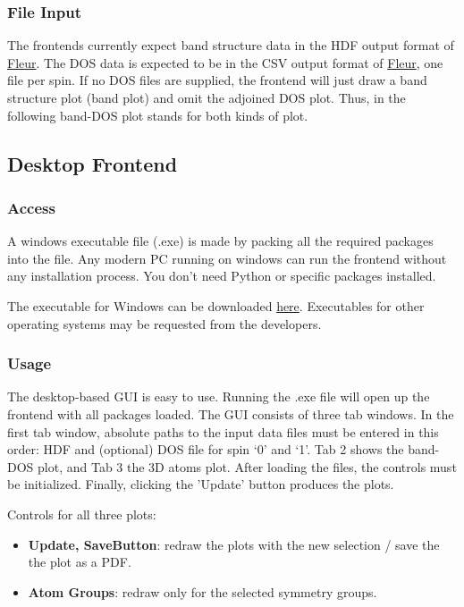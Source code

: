 \subsubsection{File Input}\label{file-input}

The frontends currently expect band structure data in the HDF output format of
\href{http://www.judft.de}{Fleur}. The DOS data is expected
to be in the CSV output format of \href{http://www.judft.de}{Fleur}, one file
per spin. If no DOS files are supplied, the frontend will just draw a band
structure plot (band plot) and omit the adjoined DOS plot. Thus, in the
following band-DOS plot stands for both kinds of plot.

\subsection{Desktop Frontend}\label{desktop-frontend}

\subsubsection{Access}\label{access}

A windows executable file (.exe) is made by packing all the required packages
into the file. Any modern PC running on windows can run the frontend without any
installation process. You don't need Python or specific packages installed.

The executable for Windows can be downloaded \href{https://rwth-aachen.sciebo.de/s/CP2dJ9M9KPDakN2}{here}. Executables for other operating systems may be requested from the developers.

\subsubsection{Usage}\label{usage}

The desktop-based GUI is easy to use. Running the .exe file will open up the
frontend with all packages loaded. The GUI consists of three tab windows. In the
first tab window, absolute paths to the input data files must be entered in this
order: HDF and (optional) DOS file for spin `0' and `1'. Tab 2 shows the
band-DOS plot, and Tab 3 the 3D atoms plot. After loading the files, the controls
must be initialized. Finally, clicking the 'Update' button produces the plots.


Controls for all three plots: 

\begin{itemize}\tightlist
\item \textbf{Update, SaveButton}: redraw the plots with the new selection / save the the plot as a PDF.
\item \textbf{Atom Groups}: redraw only for the selected symmetry groups.
\end{itemize}

